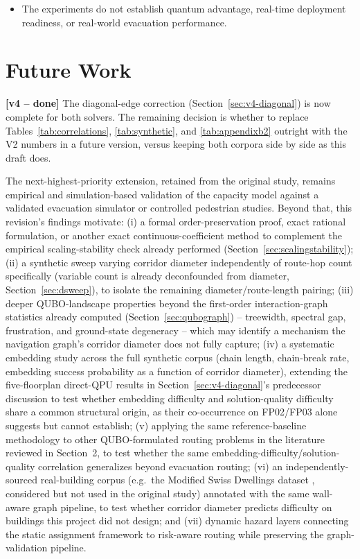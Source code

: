 \documentclass[11pt]{article}
\begin{document}
\begin{itemize}[leftmargin=*]
\item The experiments do not establish quantum advantage, real-time deployment readiness, or real-world evacuation performance.
\end{itemize}

\section{Future Work}

\textbf{[v4 -- done]} The diagonal-edge correction (Section~\ref{sec:v4-diagonal}) is now complete for both solvers. The remaining decision is whether to replace Tables~\ref{tab:correlations}, \ref{tab:synthetic}, and \ref{tab:appendixb2} outright with the V2 numbers in a future version, versus keeping both corpora side by side as this draft does.

The next-highest-priority extension, retained from the original study, remains empirical and simulation-based validation of the capacity model against a validated evacuation simulator or controlled pedestrian studies. Beyond that, this revision's findings motivate: (i) a formal order-preservation proof, exact rational formulation, or another exact continuous-coefficient method to complement the empirical scaling-stability check already performed (Section~\ref{sec:scalingstability}); (ii) a synthetic sweep varying corridor diameter independently of route-hop count specifically (variable count is already deconfounded from diameter, Section~\ref{sec:dsweep}), to isolate the remaining diameter/route-length pairing; (iii) deeper QUBO-landscape properties beyond the first-order interaction-graph statistics already computed (Section~\ref{sec:qubograph}) -- treewidth, spectral gap, frustration, and ground-state degeneracy -- which may identify a mechanism the navigation graph's corridor diameter does not fully capture; (iv) a systematic embedding study across the full synthetic corpus (chain length, chain-break rate, embedding success probability as a function of corridor diameter), extending the five-floorplan direct-QPU results in Section~\ref{sec:v4-diagonal}'s predecessor discussion to test whether embedding difficulty and solution-quality difficulty share a common structural origin, as their co-occurrence on FP02/FP03 alone suggests but cannot establish; (v) applying the same reference-baseline methodology to other QUBO-formulated routing problems in the literature reviewed in Section~2, to test whether the same embedding-difficulty/solution-quality correlation generalizes beyond evacuation routing; (vi) an independently-sourced real-building corpus (e.g.\ the Modified Swiss Dwellings dataset \cite{msd}, considered but not used in the original study) annotated with the same wall-aware graph pipeline, to test whether corridor diameter predicts difficulty on buildings this project did not design; and (vii) dynamic hazard layers connecting the static assignment framework to risk-aware routing while preserving the graph-validation pipeline.
\end{document}
